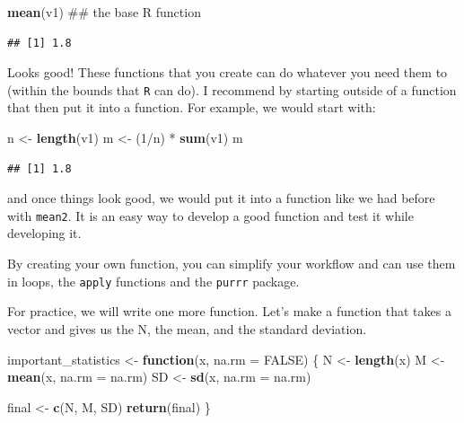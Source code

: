 \documentclass[]{tufte-book}
\newenvironment{Shaded}{}{}
\newcommand{\KeywordTok}[1]{\textcolor[rgb]{0.00,0.44,0.13}{\textbf{#1}}}
\newcommand{\DataTypeTok}[1]{\textcolor[rgb]{0.56,0.13,0.00}{#1}}
\newcommand{\DecValTok}[1]{\textcolor[rgb]{0.25,0.63,0.44}{#1}}
\newcommand{\StringTok}[1]{\textcolor[rgb]{0.25,0.44,0.63}{#1}}
\newcommand{\OtherTok}[1]{\textcolor[rgb]{0.00,0.44,0.13}{#1}}
\newcommand{\ControlFlowTok}[1]{\textcolor[rgb]{0.00,0.44,0.13}{\textbf{#1}}}
\newcommand{\OperatorTok}[1]{\textcolor[rgb]{0.40,0.40,0.40}{#1}}
\newcommand{\NormalTok}[1]{#1}
\theoremstyle{definition}
\theoremstyle{definition}
\theoremstyle{remark}
\begin{document}
\begin{Shaded}
\begin{Highlighting}[]
\KeywordTok{mean}\NormalTok{(v1)  ## the base R function}
\end{Highlighting}
\end{Shaded}

\begin{verbatim}
## [1] 1.8
\end{verbatim}

Looks good! These functions that you create can do whatever you need
them to (within the bounds that \texttt{R} can do). I recommend by
starting outside of a function that then put it into a function. For
example, we would start with:

\begin{Shaded}
\begin{Highlighting}[]
\NormalTok{n <-}\StringTok{ }\KeywordTok{length}\NormalTok{(v1)}
\NormalTok{m <-}\StringTok{ }\NormalTok{(}\DecValTok{1}\OperatorTok{/}\NormalTok{n) }\OperatorTok{*}\StringTok{ }\KeywordTok{sum}\NormalTok{(v1)}
\NormalTok{m}
\end{Highlighting}
\end{Shaded}

\begin{verbatim}
## [1] 1.8
\end{verbatim}

and once things look good, we would put it into a function like we had
before with \texttt{mean2}. It is an easy way to develop a good function
and test it while developing it.

By creating your own function, you can simplify your workflow and can
use them in loops, the \texttt{apply} functions and the \texttt{purrr}
package.

For practice, we will write one more function. Let's make a function
that takes a vector and gives us the N, the mean, and the standard
deviation.

\begin{Shaded}
\begin{Highlighting}[]
\NormalTok{important_statistics <-}\StringTok{ }\ControlFlowTok{function}\NormalTok{(x, }\DataTypeTok{na.rm =} \OtherTok{FALSE}\NormalTok{) \{}
\NormalTok{    N <-}\StringTok{ }\KeywordTok{length}\NormalTok{(x)}
\NormalTok{    M <-}\StringTok{ }\KeywordTok{mean}\NormalTok{(x, }\DataTypeTok{na.rm =}\NormalTok{ na.rm)}
\NormalTok{    SD <-}\StringTok{ }\KeywordTok{sd}\NormalTok{(x, }\DataTypeTok{na.rm =}\NormalTok{ na.rm)}
    
\NormalTok{    final <-}\StringTok{ }\KeywordTok{c}\NormalTok{(N, M, SD)}
    \KeywordTok{return}\NormalTok{(final)}
\NormalTok{\}}
\end{Highlighting}
\end{Shaded}
\end{document}
